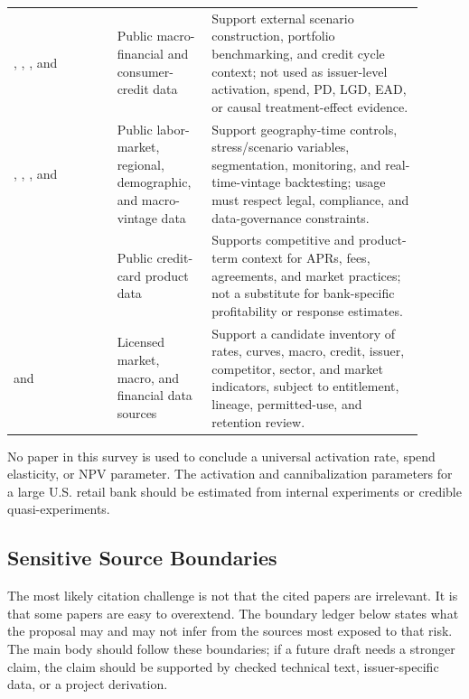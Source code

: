 \documentclass[11pt]{article}
\newcommand{\1}{\mathbf{1}}
\begin{document}
\begin{longtable}{p{0.23\linewidth}p{0.20\linewidth}p{0.47\linewidth}}
\citet{federalreserveEFA}, \citet{federalreserveG19},
\citet{federalreserveZ1}, and \citet{nyfedHhdc}
  & Public macro-financial and consumer-credit data
  & Support external scenario construction, portfolio benchmarking, and credit
    cycle context; not used as issuer-level activation, spend, PD, LGD, EAD, or
    causal treatment-effect evidence. \\
\citet{blsLAUS}, \citet{beaRegional}, \citet{censusACS},
and \citet{fredALFRED}
  & Public labor-market, regional, demographic, and macro-vintage data
  & Support geography-time controls, stress/scenario variables, segmentation,
    monitoring, and real-time-vintage backtesting; usage must respect legal,
    compliance, and data-governance constraints. \\
\citet{cfpbCreditCardData}
  & Public credit-card product data
  & Supports competitive and product-term context for APRs, fees, agreements,
    and market practices; not a substitute for bank-specific profitability or
    response estimates. \\
\citet{lsegWorkspace} and \citet{lsegEconomicData}
  & Licensed market, macro, and financial data sources
  & Support a candidate inventory of rates, curves, macro, credit, issuer,
    competitor, sector, and market indicators, subject to entitlement, lineage,
    permitted-use, and retention review. \\
\bottomrule
\end{longtable}

No paper in this survey is used to conclude a universal activation rate, spend
elasticity, or NPV parameter. The activation and cannibalization parameters for
a large U.S. retail bank should be estimated from internal experiments or
credible quasi-experiments.

\subsection*{Sensitive Source Boundaries}

The most likely citation challenge is not that the cited papers are irrelevant.
It is that some papers are easy to overextend. The boundary ledger below states
what the proposal may and may not infer from the sources most exposed to that
risk. The main body should follow these boundaries; if a future draft needs a
stronger claim, the claim should be supported by checked technical text,
issuer-specific data, or a project derivation.
\end{document}
